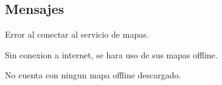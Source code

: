 \subsection{Mensajes}

\begin{Citemize}
	\item Error al conectar al servicio de mapas.
	\item Sin conexion a internet, se hara uso de sus mapas offline.
	\item No cuenta con ningun mapa offline descargado.
\end{Citemize}

\clearpage